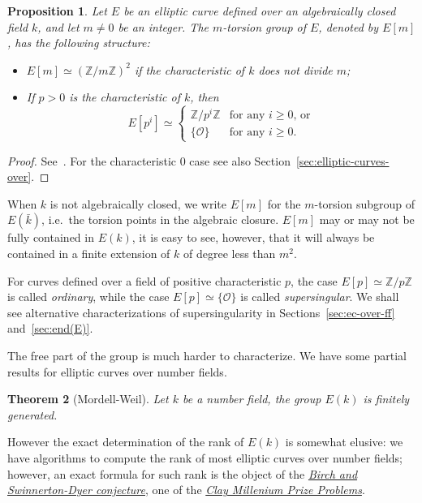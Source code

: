 \documentclass[10pt]{article}
\theoremstyle{plain}
\newtheorem{theorem}{Theorem}
\newtheorem{proposition}[theorem]{Proposition}
\theoremstyle{definition}
\def\O{\ensuremath{\mathcal{O}}}
\begin{document}
\begin{proposition}
  Let $E$ be an elliptic curve defined over an algebraically closed
  field $k$, and let $m≠0$ be an integer. %
  The $m$-torsion group of $E$, denoted by $E[m]$, has the following
  structure:
  \begin{itemize}
  \item $E[m] ≃ (ℤ/mℤ)^2$ if the characteristic of $k$ does not divide
    $m$;
  \item If $p>0$ is the characteristic of $k$, then 
    \[E[p^i] ≃
      \begin{cases}
        ℤ/p^iℤ & \text{for any $i≥0$, or}\\
        \{\O\} & \text{for any $i≥0$.}
      \end{cases}
    \]
  \end{itemize}
\end{proposition}
\begin{proof}
  See~\cite[Coro.~6.4]{silverman:elliptic}. For the characteristic $0$
  case see also Section~\ref{sec:elliptic-curves-over}.
\end{proof}

When $k$ is not algebraically closed, we write $E[m]$ for the
$m$-torsion subgroup of $E(\bar{k})$, i.e.\ the torsion points in the
algebraic closure. %
$E[m]$ may or may not be fully contained in $E(k)$, it is easy to see,
however, that it will always be contained in a finite extension of
$k$ of degree less than $m^2$.

For curves defined over a field of positive characteristic $p$, the
case $E[p]≃ℤ/pℤ$ is called \emph{ordinary}, while the case
$E[p]≃\{\O\}$ is called \emph{supersingular}. %
We shall see alternative characterizations of supersingularity in
Sections~\ref{sec:ec-over-ff} and~\ref{sec:end(E)}.

The free part of the group is much harder to characterize. %
We have some partial results for elliptic curves over number fields.

\begin{theorem}[Mordell-Weil]
  Let $k$ be a number field, the group $E(k)$ is finitely generated.
\end{theorem}

However the exact determination of the rank of $E(k)$ is somewhat
elusive: we have algorithms to compute the rank of most elliptic
curves over number fields; however, an exact formula for such rank is
the object of the
\href{https://en.wikipedia.org/wiki/Birch_and_Swinnerton-Dyer_conjecture}{\it
  Birch and Swinnerton-Dyer conjecture}, one of the
\href{https://en.wikipedia.org/wiki/Millennium_Prize_Problems}{\it
  Clay Millenium Prize Problems}.
\end{document}
